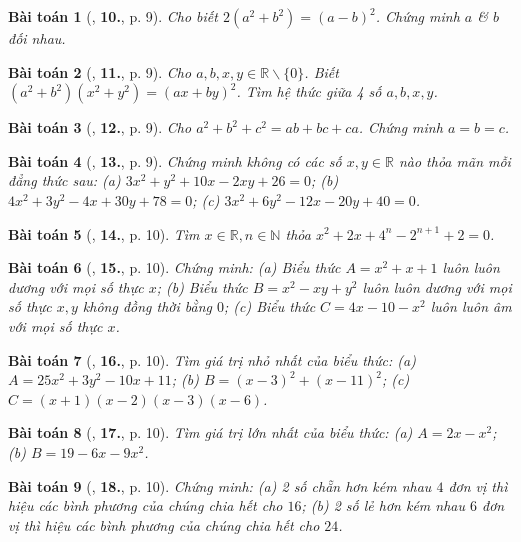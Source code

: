 \documentclass{article}
\numberwithin{equation}{section}
\newtheorem{baitoan}{Bài toán}
\begin{document}
\begin{baitoan}[\cite{Tuyen_Toan_8}, \textbf{10.}, p. 9]
	Cho biết $2(a^2 + b^2) = (a - b)^2$. Chứng minh $a$ \& $b$ đối nhau.
\end{baitoan}

\begin{baitoan}[\cite{Tuyen_Toan_8}, \textbf{11.}, p. 9]
	Cho $a,b,x,y\in\mathbb{R}\backslash\{0\}$. Biết $(a^2 + b^2)(x^2 + y^2) = (ax + by)^2$. Tìm hệ thức giữa 4 số $a,b,x,y$.
\end{baitoan}

\begin{baitoan}[\cite{Tuyen_Toan_8}, \textbf{12.}, p. 9]
	Cho $a^2 + b^2 + c^2 = ab + bc + ca$. Chứng minh $a = b = c$.
\end{baitoan}

\begin{baitoan}[\cite{Tuyen_Toan_8}, \textbf{13.}, p. 9]
	Chứng minh không có các số $x,y\in\mathbb{R}$ nào thỏa mãn mỗi đẳng thức sau: (a) $3x^2 + y^2 + 10x - 2xy + 26 = 0$; (b) $4x^2 + 3y^2 - 4x + 30y + 78 = 0$; (c) $3x^2 + 6y^2 - 12x - 20y + 40 = 0$.
\end{baitoan}

\begin{baitoan}[\cite{Tuyen_Toan_8}, \textbf{14.}, p. 10]
	Tìm $x\in\mathbb{R},n\in\mathbb{N}$ thỏa $x^2 + 2x + 4^n - 2^{n + 1} + 2 = 0$.
\end{baitoan}

\begin{baitoan}[\cite{Tuyen_Toan_8}, \textbf{15.}, p. 10]
	Chứng minh: (a) Biểu thức $A = x^2 + x + 1$ luôn luôn dương với mọi số thực $x$; (b) Biểu thức $B = x^2 - xy + y^2$ luôn luôn dương với mọi số thực $x,y$ không đồng thời bằng $0$; (c) Biểu thức $C = 4x - 10 - x^2$ luôn luôn âm với mọi số thực $x$.
\end{baitoan}

\begin{baitoan}[\cite{Tuyen_Toan_8}, \textbf{16.}, p. 10]
	Tìm giá trị nhỏ nhất của biểu thức: (a) $A = 25x^2 + 3y^2 - 10x + 11$; (b) $B = (x - 3)^2 + (x - 11)^2$; (c) $C = (x + 1)(x - 2)(x - 3)(x - 6)$.
\end{baitoan}

\begin{baitoan}[\cite{Tuyen_Toan_8}, \textbf{17.}, p. 10]
	Tìm giá trị lớn nhất của biểu thức: (a) $A = 2x - x^2$; (b) $B = 19 - 6x - 9x^2$.
\end{baitoan}

\begin{baitoan}[\cite{Tuyen_Toan_8}, \textbf{18.}, p. 10]
	Chứng minh: (a) 2 số chẵn hơn kém nhau $4$ đơn vị thì hiệu các bình phương của chúng chia hết cho $16$; (b) 2 số lẻ hơn kém nhau $6$ đơn vị thì hiệu các bình phương của chúng chia hết cho $24$.
\end{baitoan}
\end{document}
